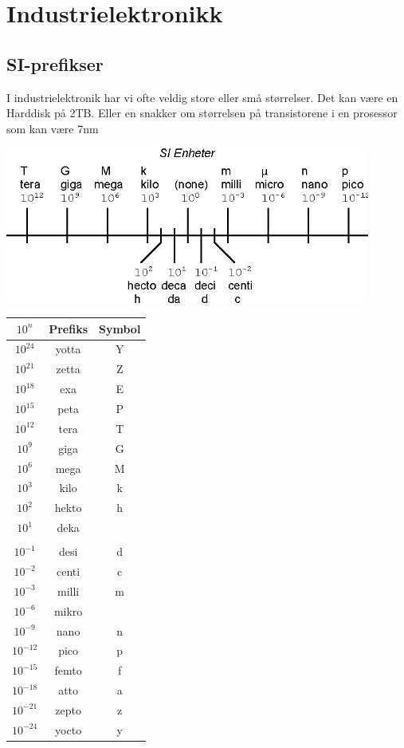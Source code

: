 \documentclass[12pt,a4paper]{article}
\providecommand{\tabularnewline}{\\}
\begin{document}
\section{Industrielektronikk}


\subsection{SI-prefikser}

I industrielektronik har vi ofte veldig store eller små størrelser. Det
kan være en Harddisk på 2TB. Eller en snakker om størrelsen på transistorene
i en prosessor som kan være 7nm

\noindent \begin{center}
	\includegraphics[width=12cm]{SIenheter.eps}
\par\end{center}

\noindent \begin{center}
\begin{tabular}{|c|c|c|}
\hline 
$10^{n}$ & Prefiks  & Symbol\tabularnewline
\hline 
\hline 
$10^{24}$ & yotta  & Y\tabularnewline
\hline 
$10^{21}$ & zetta  & Z\tabularnewline
\hline 
$10^{18}$ & exa  & E\tabularnewline
\hline 
$10^{15}$ & peta  & P\tabularnewline
\hline 
$10^{12}$ & tera  & T\tabularnewline
\hline 
$10^{9}$ & giga  & G\tabularnewline
\hline 
$10^{6}$ & mega  & M\tabularnewline
\hline 
$10^{3}$ & kilo  & k\tabularnewline
\hline 
$10^{2}$ & hekto  & h\tabularnewline
\hline 
$10^{1}$ & deka  & \tabularnewline
\hline 
 &  & \tabularnewline
\hline 
$10^{-1}$ & desi  & d\tabularnewline
\hline 
$10^{-2}$ & centi  & c\tabularnewline
\hline 
$10^{-3}$ & milli  & m\tabularnewline
\hline 
$10^{-6}$ & mikro  & \textmu{}\tabularnewline
\hline 
$10^{-9}$ & nano  & n\tabularnewline
\hline 
$10^{-12}$ & pico  & p\tabularnewline
\hline 
$10^{-15}$ & femto  & f\tabularnewline
\hline 
$10^{-18}$ & atto  & a\tabularnewline
\hline 
$10^{-21}$ & zepto  & z\tabularnewline
\hline 
$10^{-24}$ & yocto  & y\tabularnewline
\hline 
\end{tabular}
\par\end{center}
\end{document}
